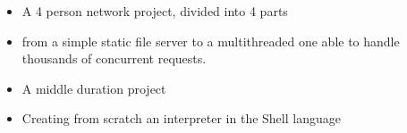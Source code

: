 \documentclass[10pt,a4paper,ragged2e]{altacv}
\begin{document}
\vspace{20px}

\begin{itemize}
    \item A 4 person network project, divided into 4 parts
    \item from a simple static file server to a multithreaded one able to handle thousands of concurrent requests.
\end{itemize}

\vspace{10px}


\begin{itemize}
    \item A middle duration project
    \item Creating from scratch an interpreter in the Shell language
\end{itemize}

\vspace{10px}


\clearpage
\end{document}
